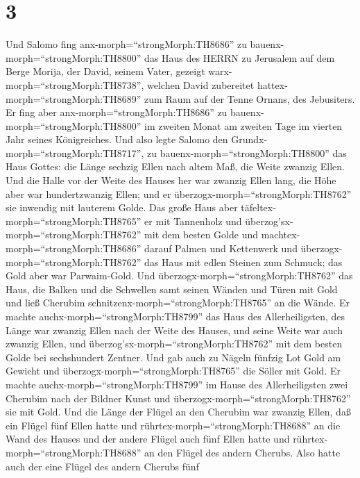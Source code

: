 \hypertarget{section-2}{%
\section{3}\label{section-2}}

 Und Salomo fing anx-morph=``strongMorph:TH8686'' zu
bauenx-morph=``strongMorph:TH8800'' das Haus des HERRN zu Jerusalem auf
dem Berge Morija, der David, seinem Vater, gezeigt
warx-morph=``strongMorph:TH8738'', welchen David zubereitet
hattex-morph=``strongMorph:TH8689'' zum Raum auf der Tenne Ornans, des
Jebusiters.  Er fing aber anx-morph=``strongMorph:TH8686''
zu bauenx-morph=``strongMorph:TH8800'' im zweiten Monat am zweiten Tage
im vierten Jahr seines Königreiches.  Und also legte Salomo
den Grundx-morph=``strongMorph:TH8717'', zu
bauenx-morph=``strongMorph:TH8800'' das Haus Gottes: die Länge sechzig
Ellen nach altem Maß, die Weite zwanzig Ellen.  Und die
Halle vor der Weite des Hauses her war zwanzig Ellen lang, die Höhe aber
war hundertzwanzig Ellen; und er überzogx-morph=``strongMorph:TH8762''
sie inwendig mit lauterem Golde.  Das große Haus aber
täfeltex-morph=``strongMorph:TH8765'' er mit Tannenholz und
überzog'sx-morph=``strongMorph:TH8762'' mit dem besten Golde und
machtex-morph=``strongMorph:TH8686'' darauf Palmen und Kettenwerk
 und überzogx-morph=``strongMorph:TH8762'' das Haus mit
edlen Steinen zum Schmuck; das Gold aber war Parwaim-Gold. 
Und überzogx-morph=``strongMorph:TH8762'' das Haus, die Balken und die
Schwellen samt seinen Wänden und Türen mit Gold und ließ Cherubim
schnitzenx-morph=``strongMorph:TH8765'' an die Wände.  Er
machte auchx-morph=``strongMorph:TH8799'' das Haus des Allerheiligsten,
des Länge war zwanzig Ellen nach der Weite des Hauses, und seine Weite
war auch zwanzig Ellen, und überzog'sx-morph=``strongMorph:TH8762'' mit
dem besten Golde bei sechshundert Zentner.  Und gab auch zu
Nägeln fünfzig Lot Gold am Gewicht und
überzogx-morph=``strongMorph:TH8765'' die Söller mit Gold. 
Er machte auchx-morph=``strongMorph:TH8799'' im Hause des
Allerheiligsten zwei Cherubim nach der Bildner Kunst und
überzogx-morph=``strongMorph:TH8762'' sie mit Gold.  Und
die Länge der Flügel an den Cherubim war zwanzig Ellen, daß ein Flügel
fünf Ellen hatte und rührtex-morph=``strongMorph:TH8688'' an die Wand
des Hauses und der andere Flügel auch fünf Ellen hatte und
rührtex-morph=``strongMorph:TH8688'' an den Flügel des andern Cherubs.
 Also hatte auch der eine Flügel des andern Cherubs fünf
